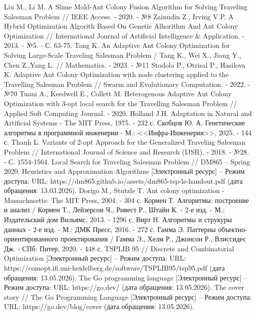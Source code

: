 \begin{thebibliography}{}
	 Liu M., Li M. A Slime Mold-Ant Colony Fusion Algorithm for Solving Traveling Salesman Problem // IEEE Access. - 2020. - №8
	 Zainudin Z., Irving V.P. A Hybrid Optimization Algorith Based On Genetic Alhorithm And Ant Colony Optimization // International Journal of Artificial Intelligence \& Application. - 2013. - №5. - С. 63-75.
	 Tang K. An Adaptive Ant Colony  Optimization for Solving Large-Scale Traveling Salesman Problem / Tang K., Wei X., Jiang Y., Chen Z.,Yang L. // Mathematics. - 2023. - №11
	 Stodola P., Otrisal P., Hasilova K. Adaptive Ant Colony Optimization with node clustering applied to the Travelling Salesman Problem // Swarm and Evolutionary Computation. - 2022. - №70
	 Tuani A., Keedwell E., Collett M. Heterogenous Adaptive Ant Colony Optimization with 3-opt local search for the Travelling Salesman Problem // Applied Soft Computing Journal. - 2020.
	 Holland J.H. Adaptation in Natural and Artificial Systems - The MIT Press, 1975. - 232 с.
	 Скобцов Ю. А. Генетические алгоритмы в программной инженерии - М.: <<Инфра-Инженерия>>, 2025. - 144 с.
	 Thanh L. Variants of 2-opt Approach for the Generalized Traveling Salesman Problem // International Journal of Science and Research (IJSR). - 2018. - №28. - С. 1554-1564.
	 Local Search for Traveling Salesman Problem // DM865 – Spring 2020, Heuristics and Approximation Algorithms [Электронный ресурс] -- Режим доступа: URL: https://dm865.github.io/assets/dm865-tsp-ls-handout.pdf (дата обращения: 13.03.2026).
	 Dorigo M., Stutzle T. Ant colony optimization - Massachusetts: The MIT Press, 2004. - 304 с.
	 Кормен Т. Алгоритмы: построение и анализ / Кормен Т., Лейзерсон Ч., Ривест Р., Штайн К. - 2-е изд. - М.: Издательский дом Вильямс, 2013. - 1296 с.
	 Вирт Н. Алгоритмы и струкуры данных - 2-е изд. - М.: ДМК Пресс, 2016. - 272 с.
	 Гамма Э. Паттерны объектно-ориентированного проектирования / Гамма Э., Хелм Р., Джонсон Р., Влиссидес Дж. - СПб: Питер, 2020. - 448 с.
	 TSPLIB 95 // Discrete and Combinatorial Optimization [Электронный ресурс] -- Режим доступа: URL: https://comopt.ifi.uni-heidelberg.de/software/TSPLIB95/tsp95.pdf (дата обращения: 13.05.2026).
	 The Go programming language [Электронный ресурс] -- Режим доступа: URL: https://go.dev/ (дата обращения: 13.05.2026).
	 The cover story // The Go Programming Language [Электронный ресурс] -- Режим доступа: URL: https://go.dev/blog/cover (дата обращения: 13.05.2026).
\end{thebibliography}
